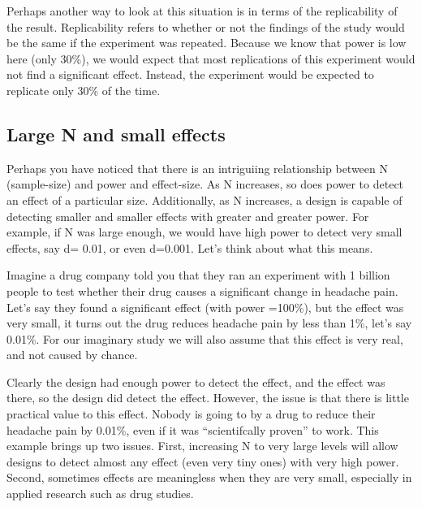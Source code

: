\documentclass[
]{book}
\begin{document}
Perhaps another way to look at this situation is in terms of the replicability of the result. Replicability refers to whether or not the findings of the study would be the same if the experiment was repeated. Because we know that power is low here (only 30\%), we would expect that most replications of this experiment would not find a significant effect. Instead, the experiment would be expected to replicate only 30\% of the time.

\subsection{Large N and small effects}\label{large-n-and-small-effects}

Perhaps you have noticed that there is an intriguiing relationship between N (sample-size) and power and effect-size. As N increases, so does power to detect an effect of a particular size. Additionally, as N increases, a design is capable of detecting smaller and smaller effects with greater and greater power. For example, if N was large enough, we would have high power to detect very small effects, say d= 0.01, or even d=0.001. Let's think about what this means.

Imagine a drug company told you that they ran an experiment with 1 billion people to test whether their drug causes a significant change in headache pain. Let's say they found a significant effect (with power =100\%), but the effect was very small, it turns out the drug reduces headache pain by less than 1\%, let's say 0.01\%. For our imaginary study we will also assume that this effect is very real, and not caused by chance.

Clearly the design had enough power to detect the effect, and the effect was there, so the design did detect the effect. However, the issue is that there is little practical value to this effect. Nobody is going to by a drug to reduce their headache pain by 0.01\%, even if it was ``scientifcally proven'' to work.
This example brings up two issues. First, increasing N to very large levels will allow designs to detect almost any effect (even very tiny ones) with very high power. Second, sometimes effects are meaningless when they are very small, especially in applied research such as drug studies.
\end{document}
